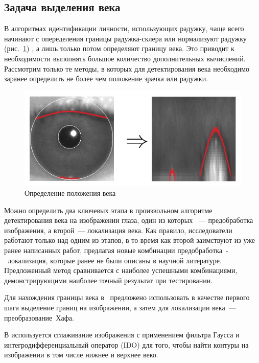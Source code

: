\documentclass[12pt,a4paper]{article} %
\begin{document}
\subsection{Задача выделения века}\label{task}
В алгоритмах идентификации личности, использующих радужку, чаще всего начинают с опеределения границы радужка-склера \cite{Adam_1, Daugman, Matv} или нормализуют радужку (рис.~\ref{fig:glaz3}) \cite{Min}, а лишь только потом определяют границу века. Это приводит к необходимости выполнять большое количество дополнительных вычислений. Рассмотрим только те методы, в которых для детектирования века необходимо заранее определить не более чем положение зрачка или радужки.

\begin{figure}[h]
	
	\centering
	
	\includegraphics[width=0.8\linewidth]{glaz3.jpg}
	
	\caption{Определение положения века}
	
	\label{fig:glaz3}
	
\end{figure}

Можно определить два ключевых этапа в произвольном алгоритме детектирования века на изображении глаза, один из которых ~--- предобработка изображения, а второй~--- локализация века. Как правило, исследователи работают только над одним из этапов, в то время как второй заимствуют из уже ранее написанных работ, предлагая новые комбинации предобработка~-~локализация, которые ранее не были описаны в научной литературе. Предложенный метод сравнивается с наиболее успешными комбинациями, демонстрирующими наиболее точный результат при тестировании.

Для нахождения границы века в~\cite{Wildes} предложено использовать в качестве первого шага выделение границ на изображении, а затем для локализации века~--- преобразование~Хафа. 

В \cite{Daugman} используется сглаживание изображения с применением фильтра Гаусса и интегродифференциальный оператор
(IDO) для того, чтобы найти контуры на изображении в том числе нижнее и верхнее веко.
\end{document}
